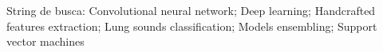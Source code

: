 String de busca:
Convolutional neural network; Deep learning; Handcrafted features extraction; Lung sounds classification; Models ensembling; Support vector machines
